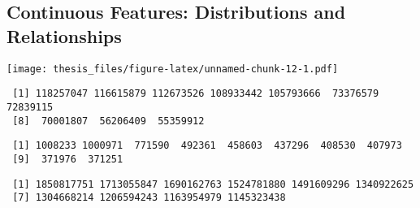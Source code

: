 \documentclass[12pt,twoside]{dukestatscithesis}
\theoremstyle{definition}
\theoremstyle{definition}
\theoremstyle{definition}
\theoremstyle{remark}
\begin{document}
\subsection{Continuous Features: Distributions and
Relationships}\label{continuous-features-distributions-and-relationships}
\begin{Shaded}
\begin{Highlighting}[]
\NormalTok{(}\NormalTok{(}\NormalTok{,}\NormalTok{))}
\end{Highlighting}
\end{Shaded}
\texttt{[image: thesis\_files/figure-latex/unnamed-chunk-12-1.pdf]}
\begin{Shaded}
\begin{Highlighting}[]
\StringTok{ }
  \NormalTok{(}
\NormalTok{\}}
\NormalTok{)}
\end{Highlighting}
\end{Shaded}
\begin{verbatim}
 [1] 118257047 116615879 112673526 108933442 105793666  73376579  72839115
 [8]  70001807  56206409  55359912
\end{verbatim}
\begin{Shaded}
\begin{Highlighting}[]
\NormalTok{)}
\end{Highlighting}
\end{Shaded}
\begin{verbatim}
 [1] 1008233 1000971  771590  492361  458603  437296  408530  407973
 [9]  371976  371251
\end{verbatim}
\begin{Shaded}
\begin{Highlighting}[]
\NormalTok{)}
\end{Highlighting}
\end{Shaded}
\begin{verbatim}
 [1] 1850817751 1713055847 1690162763 1524781880 1491609296 1340922625
 [7] 1304668214 1206594243 1163954979 1145323438
\end{verbatim}
\end{document}
